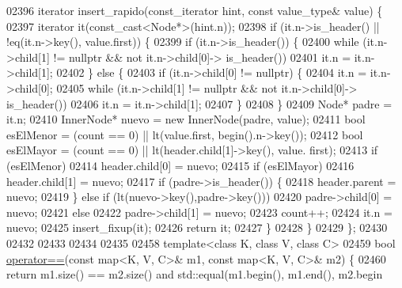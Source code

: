 \begin{DoxyCode}
02396     iterator insert\_rapido(const\_iterator hint, \textcolor{keyword}{const} value\_type& value) \{
02397         iterator it(const\_cast<Node*>(hint.n));
02398         \textcolor{keywordflow}{if} (it.n->is\_header() || !eq(it.n->key(), value.first)) \{
02399             \textcolor{keywordflow}{if} (it.n->is\_header()) \{
02400                 \textcolor{keywordflow}{while} (it.n->child[1] != \textcolor{keyword}{nullptr} && not it.n->child[0]->
      is\_header())
02401                     it.n = it.n->child[1];
02402             \} \textcolor{keywordflow}{else} \{
02403                 \textcolor{keywordflow}{if} (it.n->child[0] != \textcolor{keyword}{nullptr}) \{
02404                     it.n = it.n->child[0];
02405                     \textcolor{keywordflow}{while} (it.n->child[1] != \textcolor{keyword}{nullptr} && not it.n->child[0]->
      is\_header())
02406                         it.n = it.n->child[1];
02407                 \}
02408             \}
02409             Node* padre = it.n;
02410             InnerNode* nuevo = \textcolor{keyword}{new} InnerNode(padre, value);
02411             \textcolor{keywordtype}{bool} esElMenor = (count == 0) || lt(value.first, begin().n->key());
02412             \textcolor{keywordtype}{bool} esElMayor = (count == 0) || lt(header.child[1]->key(), value.
      first);
02413             \textcolor{keywordflow}{if} (esElMenor)
02414                 header.child[0] = nuevo;
02415             \textcolor{keywordflow}{if} (esElMayor)
02416                 header.child[1] = nuevo;
02417             \textcolor{keywordflow}{if} (padre->is\_header()) \{
02418                 header.parent = nuevo;
02419             \} \textcolor{keywordflow}{else} \textcolor{keywordflow}{if} (lt(nuevo->key(),padre->key()))
02420                 padre->child[0] = nuevo;
02421             \textcolor{keywordflow}{else}
02422                 padre->child[1] = nuevo;
02423             count++;
02424             it.n = nuevo;
02425             insert\_fixup(it);
02426             \textcolor{keywordflow}{return} it;
02427         \}
02428     \}
02429 \};
02430 
02432 
02433 
02434 
02435 
02458 \textcolor{keyword}{template}<\textcolor{keyword}{class} K, \textcolor{keyword}{class} V, \textcolor{keyword}{class} C>
02459 \textcolor{keywordtype}{bool} \hyperlink{classaed2_1_1map_abfc51b39670220e79037ac067006e933_abfc51b39670220e79037ac067006e933}{operator==}(\textcolor{keyword}{const} map<K, V, C>& m1, \textcolor{keyword}{const} map<K, V, C>& m2) \{
02460     \textcolor{keywordflow}{return} m1.size() == m2.size() and std::equal(m1.begin(), m1.end(), m2.begin

\end{DoxyCode}
